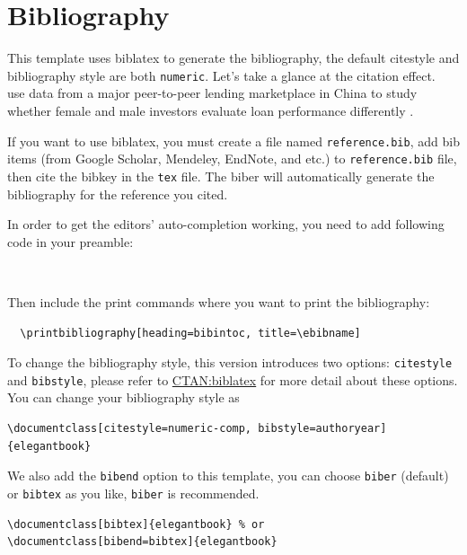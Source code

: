 \documentclass[11pt,bibtex]{elegantbook}
\begin{document}
\section{Bibliography}

This template uses biblatex to generate the bibliography, the default citestyle and bibliography style are both \lstinline{numeric}. Let's take a glance at the citation effect. ~\cite{en1} use data from a major peer-to-peer lending \cite{en3} marketplace in China to study whether female and male investors evaluate loan performance differently \parencite{en2}.

If you want to use biblatex, you must create a file named \lstinline{reference.bib}, add bib items (from Google Scholar, Mendeley, EndNote, and etc.) to \lstinline{reference.bib} file, then cite the bibkey in the \lstinline{tex} file. The biber will automatically generate the bibliography for the reference you cited.

In order to get the editors' auto-completion working, you need to add following code in your preamble:

\begin{lstlisting}
  
\end{lstlisting}

Then include the print commands where you want to print the bibliography:
\begin{lstlisting}
  \printbibliography[heading=bibintoc, title=\ebibname]
\end{lstlisting}




To change the bibliography style, this version introduces two options: \lstinline{citestyle} and \lstinline{bibstyle}, please refer to \href{https://ctan.org/pkg/biblatex}{CTAN:biblatex} for more detail about these options. You can change your bibliography style as

\begin{lstlisting}
\documentclass[citestyle=numeric-comp, bibstyle=authoryear]{elegantbook}
\end{lstlisting}

We also add the \lstinline{bibend} option to this template, you can choose \lstinline{biber} (default) or \lstinline{bibtex} as you like, \lstinline{biber} is recommended.

\begin{lstlisting}
\documentclass[bibtex]{elegantbook} % or
\documentclass[bibend=bibtex]{elegantbook}
\end{lstlisting}
\end{document}
